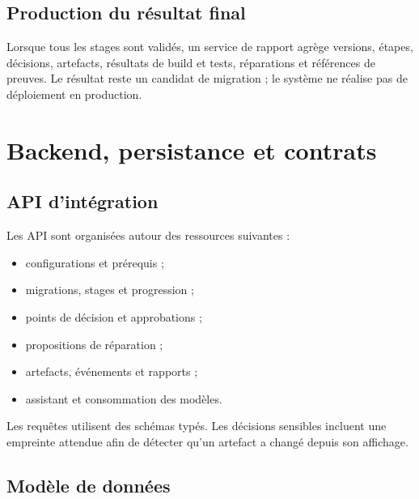 \subsection{Production du résultat final}

Lorsque tous les stages sont validés, un service de rapport agrège versions, étapes, décisions, artefacts, résultats de build et tests, réparations et références de preuves. Le résultat reste un candidat de migration ; le système ne réalise pas de déploiement en production.

\section{Backend, persistance et contrats}

\subsection{API d'intégration}

Les API sont organisées autour des ressources suivantes :

\begin{itemize}
    \item configurations et prérequis ;
    \item migrations, stages et progression ;
    \item points de décision et approbations ;
    \item propositions de réparation ;
    \item artefacts, événements et rapports ;
    \item assistant et consommation des modèles.
\end{itemize}

Les requêtes utilisent des schémas typés. Les décisions sensibles incluent une empreinte attendue afin de détecter qu'un artefact a changé depuis son affichage.

\subsection{Modèle de données}

